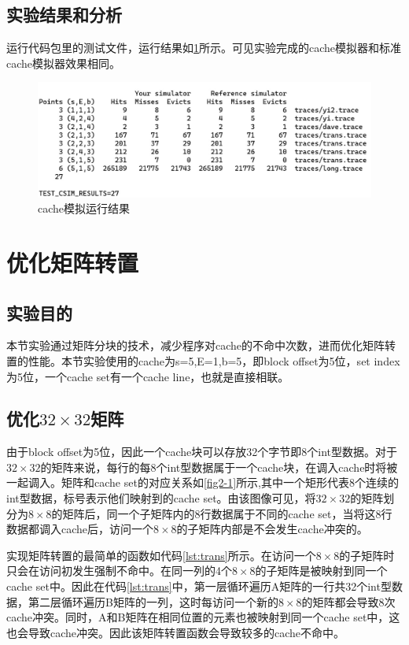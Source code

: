 \documentclass[supercite]{Experimental_Report}
\theoremstyle{definition}
\begin{document}
\subsection{实验结果和分析}
运行代码包里的测试文件，运行结果如\ref{fig1-1}所示。可见实验完成的cache模拟器和标准cache模拟器效果相同。
\begin{figure}[htb]
	\begin{center}
		\includegraphics[scale=0.7]{./images/lab1_1.jpg}
		\caption{cache模拟运行结果}
		\label{fig1-1}
	\end{center}
\end{figure}


\newpage
\section{优化矩阵转置}
\subsection{实验目的}
本节实验通过矩阵分块的技术，减少程序对cache的不命中次数，进而优化矩阵转置的性能。本节实验使用的cache为s=5,E=1,b=5，即block offset为5位，set index为5位，一个cache set有一个cache line，也就是直接相联。

\subsection{优化$32\times32$矩阵}
由于block offset为5位，因此一个cache块可以存放32个字节即8个int型数据。对于$32\times32$的矩阵来说，每行的每8个int型数据属于一个cache块，在调入cache时将被一起调入。矩阵和cache set的对应关系如\ref{fig2-1}所示,其中一个矩形代表8个连续的int型数据，标号表示他们映射到的cache set。由该图像可见，将$32\times32$的矩阵划分为$8\times8$的矩阵后，同一个子矩阵内的8行数据属于不同的cache set，当将这8行数据都调入cache后，访问一个$8\times8$的子矩阵内部是不会发生cache冲突的。

实现矩阵转置的最简单的函数如代码\ref{lst:trans}所示。在访问一个$8\times8$的子矩阵时只会在访问初发生强制不命中。在同一列的4个$8\times8$的子矩阵是被映射到同一个cache set中。因此在代码\ref{lst:trans}中，第一层循环遍历A矩阵的一行共32个int型数据，第二层循环遍历B矩阵的一列，这时每访问一个新的$8\times8$的矩阵都会导致8次cache冲突。同时，A和B矩阵在相同位置的元素也被映射到同一个cache set中，这也会导致cache冲突。因此该矩阵转置函数会导致较多的cache不命中。
\end{document}
